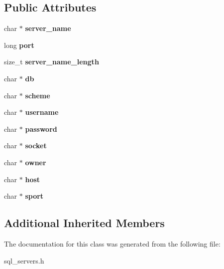 \subsection*{Public Attributes}
\begin{DoxyCompactItemize}
\item 
\mbox{\label{classFOREIGN__SERVER_a40685ae97595ae644da64d474e41d05b}} 
char $\ast$ {\bfseries server\+\_\+name}
\item 
\mbox{\label{classFOREIGN__SERVER_adf93d7d6e51a75d70ac1e36640615c27}} 
long {\bfseries port}
\item 
\mbox{\label{classFOREIGN__SERVER_a9d4c3dfbd44c5565289cbdfb3eaeec54}} 
size\+\_\+t {\bfseries server\+\_\+name\+\_\+length}
\item 
\mbox{\label{classFOREIGN__SERVER_af6fafa03f688345a7cae766914130683}} 
char $\ast$ {\bfseries db}
\item 
\mbox{\label{classFOREIGN__SERVER_a5436b50ebfb8a9534965dfccbeb29bce}} 
char $\ast$ {\bfseries scheme}
\item 
\mbox{\label{classFOREIGN__SERVER_ad775a08a6e9522763499c42eb7c43aa8}} 
char $\ast$ {\bfseries username}
\item 
\mbox{\label{classFOREIGN__SERVER_a3a8a257c233f9ac52f01eefc82e092ae}} 
char $\ast$ {\bfseries password}
\item 
\mbox{\label{classFOREIGN__SERVER_ab8ccd36106c017f699d232ca2c4ddc12}} 
char $\ast$ {\bfseries socket}
\item 
\mbox{\label{classFOREIGN__SERVER_a8b2bb2301e294d702a2685b8be0b2972}} 
char $\ast$ {\bfseries owner}
\item 
\mbox{\label{classFOREIGN__SERVER_abe2c2d7c211e378e9791a684b2964be3}} 
char $\ast$ {\bfseries host}
\item 
\mbox{\label{classFOREIGN__SERVER_a3a1bdad5b7b2850c2ec868d1715394b3}} 
char $\ast$ {\bfseries sport}
\end{DoxyCompactItemize}
\subsection*{Additional Inherited Members}


The documentation for this class was generated from the following file\+:\begin{DoxyCompactItemize}
\item 
sql\+\_\+servers.\+h\end{DoxyCompactItemize}
